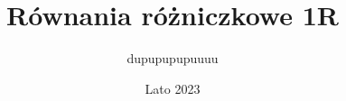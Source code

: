 \documentclass{article}
\title{Równania różniczkowe 1R}
\author{dupupupupuuuu}
\date{Lato 2023}
\begin{document}
\maketit

\tableofcontents
\newpage


\newpage


\newpage


\end{document}
